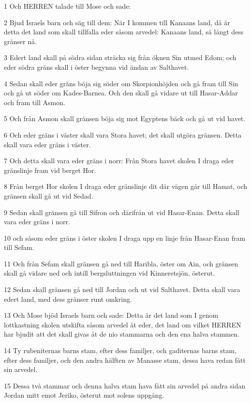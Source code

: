 \par 1 Och HERREN talade till Mose och sade:
\par 2 Bjud Israels barn och säg till dem: När I kommen till Kanaans land, då är detta det land som skall tillfalla eder såsom arvedel: Kanaans land, så långt dess gränser nå.
\par 3 Edert land skall på södra sidan sträcka sig från öknen Sin utmed Edom; och eder södra gräns skall i öster begynna vid ändan av Salthavet.
\par 4 Sedan skall eder gräns böja sig söder om Skorpionhöjden och gå fram till Sin och gå ut söder om Kades-Barnea. Och den skall gå vidare ut till Hasar-Addar och fram till Asmon.
\par 5 Och från Asmon skall gränsen böja sig mot Egyptens bäck och gå ut vid havet.
\par 6 Och eder gräns i väster skall vara Stora havet; det skall utgöra gränsen. Detta skall vara eder gräns i väster.
\par 7 Och detta skall vara eder gräns i norr: Från Stora havet skolen I draga eder gränslinje fram vid berget Hor.
\par 8 Från berget Hor skolen I draga eder gränslinje dit där vägen går till Hamat, och gränsen skall gå ut vid Sedad.
\par 9 Sedan skall gränsen gå till Sifron och därifrån ut vid Hasar-Enan. Detta skall vara eder gräns i norr.
\par 10 och såsom eder gräns i öster skolen I draga upp en linje från Hasar-Enan fram till Sefam.
\par 11 Och från Sefam skall gränsen gå ned till Haribla, öster om Ain, och gränsen skall gå vidare ned och intill bergsluttningen vid Kinneretsjön, österut.
\par 12 Sedan skall gränsen gå ned till Jordan och ut vid Salthavet. Detta skall vara edert land, med dess gränser runt omkring.
\par 13 Och Mose bjöd Israels barn och sade: Detta är det land som I genom lottkastning skolen utskifta såsom arvedel åt eder, det land om vilket HERREN har bjudit att det skall givas åt de nio stammarna och den ena halva stammen.
\par 14 Ty rubeniternas barns stam, efter dess familjer, och gaditernas barns stam, efter dess familjer, och den andra hälften av Manasse stam, dessa hava redan fått sin arvedel.
\par 15 Dessa två stammar och denna halva stam hava fått sin arvedel på andra sidan Jordan mitt emot Jeriko, österut mot solens uppgång.
